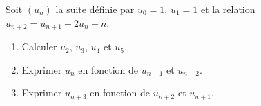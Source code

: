 \documentclass[11pt]{article}
\begin{document}
\begin{exo}
  Soit $(u_n)$ la suite définie par $u_0 = 1$, $u_1 = 1$ et la relation $u_{n+2}
  = u_{n+1} + 2u_n + n$.
\begin{enumerate}
    \item Calculer $u_2$, $u_3$, $u_4$ et $u_5$.
    \item Exprimer $u_n$ en fonction de $u_{n-1}$ et $u_{n-2}$.
    \item Exprimer $u_{n+3}$ en fonction de $u_{n+2}$ et $u_{n+1}$.
\end{enumerate}
\end{exo}
\end{document}
